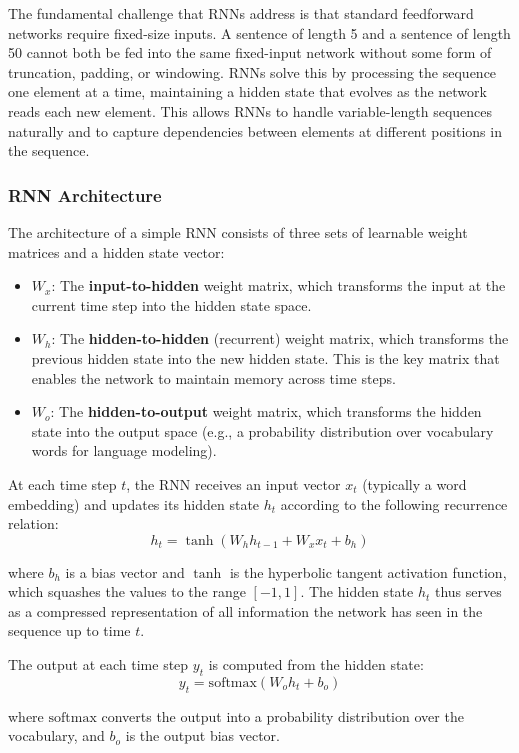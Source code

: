 \documentclass[11pt,a4paper]{article}
\begin{document}
The fundamental challenge that RNNs address is that standard feedforward networks require fixed-size inputs. A sentence of length 5 and a sentence of length 50 cannot both be fed into the same fixed-input network without some form of truncation, padding, or windowing. RNNs solve this by processing the sequence one element at a time, maintaining a hidden state that evolves as the network reads each new element. This allows RNNs to handle variable-length sequences naturally and to capture dependencies between elements at different positions in the sequence.

\subsubsection{RNN Architecture}

The architecture of a simple RNN consists of three sets of learnable weight matrices and a hidden state vector:
\begin{itemize}
    \item $W_x$: The \textbf{input-to-hidden} weight matrix, which transforms the input at the current time step into the hidden state space.
    \item $W_h$: The \textbf{hidden-to-hidden} (recurrent) weight matrix, which transforms the previous hidden state into the new hidden state. This is the key matrix that enables the network to maintain memory across time steps.
    \item $W_o$: The \textbf{hidden-to-output} weight matrix, which transforms the hidden state into the output space (e.g., a probability distribution over vocabulary words for language modeling).
\end{itemize}

At each time step $t$, the RNN receives an input vector $x_t$ (typically a word embedding) and updates its hidden state $h_t$ according to the following recurrence relation:
\[
h_t = \tanh(W_h h_{t-1} + W_x x_t + b_h)
\]

where $b_h$ is a bias vector and $\tanh$ is the hyperbolic tangent activation function, which squashes the values to the range $[-1, 1]$. The hidden state $h_t$ thus serves as a compressed representation of all information the network has seen in the sequence up to time $t$.

The output at each time step $y_t$ is computed from the hidden state:
\[
y_t = \text{softmax}(W_o h_t + b_o)
\]

where $\text{softmax}$ converts the output into a probability distribution over the vocabulary, and $b_o$ is the output bias vector.
\end{document}
